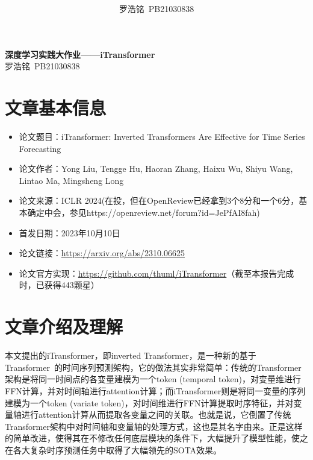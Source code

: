 \documentclass[twoside,12pt]{article}
\title{ }
\author{罗浩铭\ PB21030838}
\begin{document}
\fancyhf{} %
\fancyfoot[C]{\thepage} %
\fancyhead[l]{\footnotesize  }

\renewcommand{\headrulewidth}{0pt} %

\begin{center}
  \textbf{\LARGE{深度学习实践大作业——iTransformer}}\\
  \vspace{0.2cm}
  \large{罗浩铭\ PB21030838}
\end{center}

\section{文章基本信息}

\begin{itemize}
  \item 论文题目：iTransformer: Inverted Transformers Are Effective for Time Series Forecasting~\citep{itransformer}
  \item 论文作者：Yong Liu, Tengge Hu, Haoran Zhang, Haixu Wu, Shiyu Wang, Lintao Ma, Mingsheng Long
  \item 论文来源：ICLR 2024(在投，但在OpenReview已经拿到3个8分和一个6分，基本确定中会，参见https://openreview.net/forum?id=JePfAI8fah)
  \item 首发日期：2023年10月10日
  \item 论文链接：\url{https://arxiv.org/abs/2310.06625}
  \item 论文官方实现：\url{https://github.com/thuml/iTransformer}（截至本报告完成时，已获得443颗星）
\end{itemize}



\section{文章介绍及理解}

本文提出的iTransformer，即inverted Transformer，是一种新的基于Transformer~\citep{Transformer}的时间序列预测架构，它的做法其实非常简单：传统的Transformer架构是将同一时间点的各变量建模为一个token (temporal token)，对变量维进行FFN计算，并对时间轴进行attention计算；而iTransformer则是将同一变量的序列建模为一个token (variate token)，对时间维进行FFN计算提取时序特征，并对变量轴进行attention计算从而提取各变量之间的关联。也就是说，它倒置了传统Transformer架构中对时间轴和变量轴的处理方式，这也是其名字由来。正是这样的简单改进，使得其在不修改任何底层模块的条件下，大幅提升了模型性能，使之在各大复杂时序预测任务中取得了大幅领先的SOTA效果。
\end{document}
